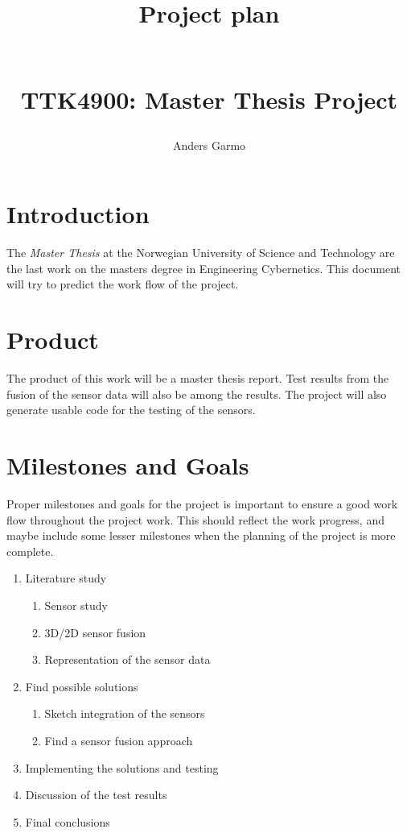 \documentclass[a4paper, 10pt]{article}
\title{\begin{huge}\textbf{Project plan}\end{huge} \\ TTK4900: Master Thesis Project }
\author{Anders Garmo}
\begin{document}
\maketitle

\newpage


\section{Introduction}
The \emph{Master Thesis} at the Norwegian University of Science and Technology are the
last work on the masters degree in Engineering Cybernetics. This document will try to
predict the work flow of the project. 

\section{Product}
The product of this work will be a master thesis report. Test results from the fusion of
the sensor data will also be among the results. The project will also generate usable code
for the testing of the sensors. 

\section{Milestones and Goals}
Proper milestones and goals for the project is important to ensure a good work flow throughout the
project work. This should reflect the work progress, and maybe include some lesser
milestones when the planning of the project is more complete.

\begin{enumerate}
    \item Literature study
        \begin{enumerate}
            \item Sensor study
            \item 3D/2D sensor fusion
            \item Representation of the sensor data
        \end{enumerate}
    \item Find possible solutions
        \begin{enumerate}
            \item Sketch integration of the sensors
            \item Find a sensor fusion approach
        \end{enumerate}
    \item Implementing the solutions and testing
    \item Discussion of the test results
    \item Final conclusions
\end{enumerate}
\end{document}
